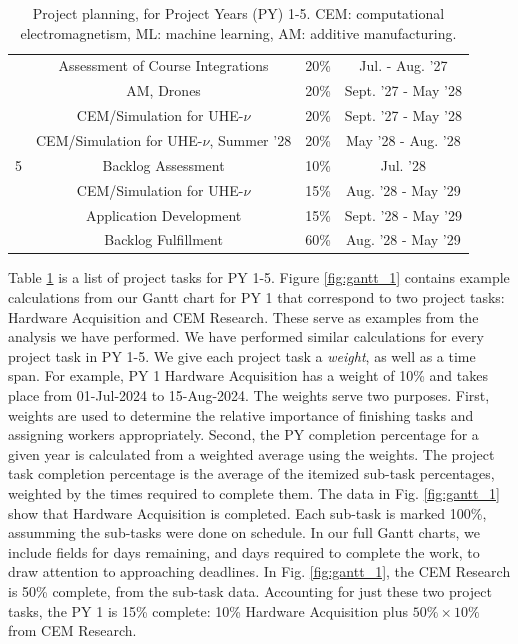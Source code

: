 \documentclass[11pt]{amsart}
\begin{document}
\begin{table}[ht]
\begin{tabular}{c | c | c | c}
 & Assessment of Course Integrations & 20\% & Jul. - Aug. '27 \\
 & AM, Drones & 20\% & Sept. '27 - May '28 \\
 & CEM/Simulation for UHE-$\nu$ & 20\% & Sept. '27 - May '28 \\
 & CEM/Simulation for UHE-$\nu$, Summer '28 & 20\% & May '28 - Aug. '28 \\
\hline
5 & Backlog Assessment & 10\% & Jul. '28 \\
 & CEM/Simulation for UHE-$\nu$ & 15\% & Aug. '28 - May '29 \\
 & Application Development & 15\% & Sept. '28 - May '29 \\
 & Backlog Fulfillment & 60\% & Aug. '28 - May '29 \\ 
\hline
\end{tabular}
\caption{\label{tab:plan} Project planning, for Project Years (PY) 1-5.  CEM: computational electromagnetism, ML: machine learning, AM: additive manufacturing.}
\end{table}

Table \ref{tab:plan} is a list of project tasks for PY 1-5.  Figure \ref{fig:gantt_1} contains example calculations from our Gantt chart for PY 1 that correspond to two project tasks: Hardware Acquisition and CEM Research.  These serve as examples from the analysis we have performed.  We have performed similar calculations for every project task in PY 1-5.  We give each project task a \textit{weight}, as well as a time span.  For example, PY 1 Hardware Acquisition has a weight of 10\% and takes place from 01-Jul-2024 to 15-Aug-2024.  The weights serve two purposes.  First, weights are used to determine the relative importance of finishing tasks and assigning workers appropriately.  Second, the PY completion percentage for a given year is calculated from a weighted average using the weights.  The project task completion percentage is the average of the itemized sub-task percentages, weighted by the times required to complete them.  The data in Fig. \ref{fig:gantt_1} show that Hardware Acquisition is completed.  Each sub-task is marked 100\%, assumming the sub-tasks were done on schedule.  In our full Gantt charts, we include fields for days remaining, and days required to complete the work, to draw attention to approaching deadlines.  In Fig. \ref{fig:gantt_1}, the CEM Research is 50\% complete, from the sub-task data.  Accounting for just these two project tasks, the PY 1 is 15\% complete: 10\% Hardware Acquisition plus $50\% \times 10\%$ from CEM Research. 
\end{document}
